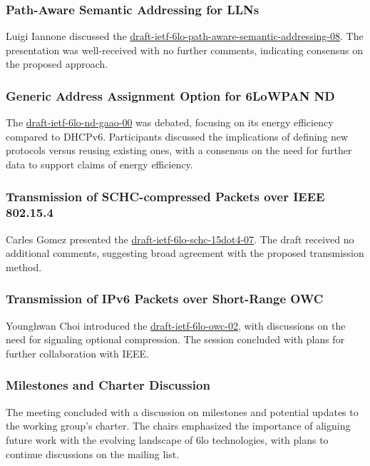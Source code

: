 \documentclass{article}
\begin{document}
\subsubsection{Path-Aware Semantic Addressing for LLNs}
Luigi Iannone discussed the \href{https://datatracker.ietf.org/doc/html/draft-ietf-6lo-path-aware-semantic-addressing-08}{draft-ietf-6lo-path-aware-semantic-addressing-08}. The presentation was well-received with no further comments, indicating consensus on the proposed approach.

\subsubsection{Generic Address Assignment Option for 6LoWPAN ND}
The \href{https://datatracker.ietf.org/doc/html/draft-ietf-6lo-nd-gaao-00}{draft-ietf-6lo-nd-gaao-00} was debated, focusing on its energy efficiency compared to DHCPv6. Participants discussed the implications of defining new protocols versus reusing existing ones, with a consensus on the need for further data to support claims of energy efficiency.

\subsubsection{Transmission of SCHC-compressed Packets over IEEE 802.15.4}
Carles Gomez presented the \href{https://datatracker.ietf.org/doc/html/draft-ietf-6lo-schc-15dot4-07}{draft-ietf-6lo-schc-15dot4-07}. The draft received no additional comments, suggesting broad agreement with the proposed transmission method.

\subsubsection{Transmission of IPv6 Packets over Short-Range OWC}
Younghwan Choi introduced the \href{https://datatracker.ietf.org/doc/html/draft-ietf-6lo-owc-02}{draft-ietf-6lo-owc-02}, with discussions on the need for signaling optional compression. The session concluded with plans for further collaboration with IEEE.

\subsubsection{Milestones and Charter Discussion}
The meeting concluded with a discussion on milestones and potential updates to the working group's charter. The chairs emphasized the importance of aligning future work with the evolving landscape of 6lo technologies, with plans to continue discussions on the mailing list.
\end{document}

